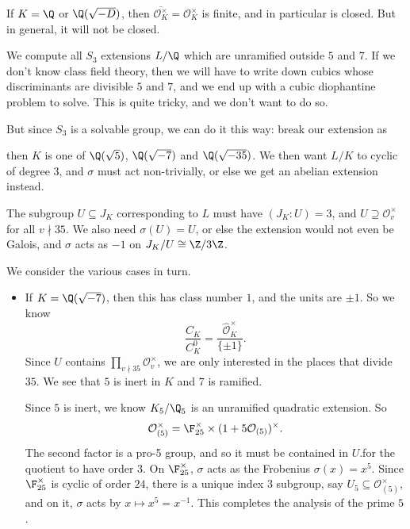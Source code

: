\documentclass[a4paper]{article}
\begin{document}
If $K = \Q $ or $\Q(\sqrt{-D})$, then $\overline{\mathcal{O}_K^\times} = \mathcal{O}_K^\times$ is finite, and in particular is closed. But in general, it will not be closed.

\begin{eg}
  We compute all $S_3$ extensions $L/\Q$ which are unramified outside $5$ and $7$. If we don't know class field theory, then we will have to write down cubics whose discriminants are divisible $5$ and $7$, and we end up with a cubic diophantine problem to solve. This is quite tricky, and we don't want to do so.

  But since $S_3$ is a solvable group, we can do it this way: break our extension as
  \begin{center}
  \end{center}
  then $K$ is one of $\Q(\sqrt{5})$, $\Q(\sqrt{-7})$ and $\Q(\sqrt{-35})$. We then want $L/K$ to cyclic of degree $3$, and $\sigma$ must act non-trivially, or else we get an abelian extension instead.

  The subgroup $U \subseteq J_K$ corresponding to $L$ must have $(J_K: U) = 3$, and $U \supseteq \mathcal{O}_v^\times$ for all $v \nmid 35$. We also need $\sigma(U) = U$, or else the extension would not even be Galois, and $\sigma$ acts as $-1$ on $J_K/U \cong \Z/3\Z$.

  We consider the various cases in turn.
  \begin{itemize}
    \item If $K = \Q(\sqrt{-7})$, then this has class number $1$, and the units are $\pm 1$. So we know
      \[
        \frac{C_K}{C_K^0} = \frac{\hat{\mathcal{O}}_K^\times}{\{\pm 1\}}.
      \]
      Since $U$ contains $\prod_{v \nmid 35} \mathcal{O}_v^\times$, we are only interested in the places that divide $35$. We see that $5$ is inert in $K$ and $7$ is ramified.

      Since $5$ is inert, we know $K_5/\Q_5$ is an unramified quadratic extension. So
      \[
        \mathcal{O}_{(5)}^\times = \F_{25}^\times \times (1 + 5\mathcal{O}_{(5)})^\times.
      \]
      The second factor is a pro-5 group, and so it must be contained in $U$.for the quotient to have order $3$. On $\F_{25}^\times$, $\sigma$ acts as the Frobenius $\sigma(x) = x^5$. Since $\F_{25}^\times$ is cyclic of order $24$, there is a unique index $3$ subgroup, say $U_5 \subseteq \mathcal{O}_{(5)}^\times$, and on it, $\sigma$ acts by $x \mapsto x^5 = x^{-1}$. This completes the analysis of the prime $5$.


\end{itemize}
\end{eg}
\end{document}
